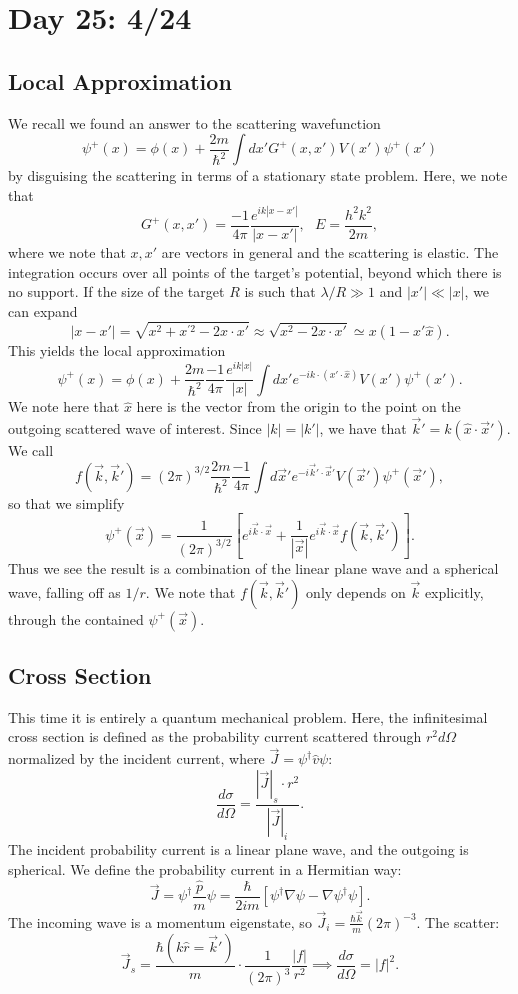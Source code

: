 \documentclass[fontsize=12pt]{scrartcl}
\newcommand{\mom}{\hat{p}}
\begin{document}
\section{Day 25: 4/24}

\subsection{Local Approximation}

We recall we found an answer to the scattering wavefunction $$\psi^+(x)=\phi(x)+\frac{2m}{\hbar^2}\int dx' G^+(x,x')V(x')\psi^+(x')$$ by disguising the scattering in terms of a stationary state problem. Here, we note that $$G^+(x,x')=\frac{-1}{4\pi} \frac{e^{ik|x-x'|}}{|x-x'|}, \ \ \ E=\frac{h^2k^2}{2m},$$ where we note that $x,x'$ are vectors in general and the scattering is elastic. The integration occurs over all points of the target's potential, beyond which there is no support. If the size of the target $R$ is such that $\lambda/R\gg 1$ and $|x'|\ll |x|$, we can expand $$|x-x'| = \sqrt{x^2+x^{'2}-2x\cdot x'}\approx \sqrt{x^2-2x\cdot x'} \simeq x(1-x'\hat{x}).$$ This yields the local approximation $$\psi^+(x)=\phi(x)+\frac{2m}{\hbar^2}\frac{-1}{4\pi}\frac{e^{ik|x|}}{|x|}\int dx' e^{-ik\cdot (x'\cdot \hat{x})} V(x')\psi^+(x').$$ We note here that $\hat{x}$ here is the vector from the origin to the point on the outgoing scattered wave of interest. Since $|k|=|k'|$, we have that $\vec{k}' = k(\hat{x}\cdot\vec{x}')$. We call $$f(\vec{k},\vec{k}') = (2\pi)^{3/2}\frac{2m}{\hbar^2}\frac{-1}{4\pi}\int d\vec{x}' e^{-i\vec{k}'\cdot\vec{x}'} V(\vec{x}')\psi^+(\vec{x}'),$$ so that we simplify $$\psi^+(\vec{x})=\frac{1}{(2\pi)^{3/2}}\left[e^{i\vec{k}\cdot\vec{x}}+\frac{1}{|\vec{x}|} e^{i\vec{k}\cdot\vec{x}}f(\vec{k},\vec{k}')\right].$$ Thus we see the result is a combination of the linear plane wave and a spherical wave, falling off as $1/r$. We note that $f(\vec{k},\vec{k}')$ only depends on $\vec{k}$ explicitly, through the contained $\psi^+(\vec{x})$.

\subsection{Cross Section}

This time it is entirely a quantum mechanical problem. Here, the infinitesimal cross section is defined as the probability current scattered through $r^2d\Omega$ normalized by the incident current, where $\vec{J}=\psi^\dagger\hat{v}\psi$: $$\frac{d\sigma}{d\Omega}=\frac{|\vec{J}|_s\cdot r^2}{|\vec{J}|_i}.$$ The incident probability current is a linear plane wave, and the outgoing is spherical. We define the probability current in a Hermitian way: $$\vec{J}=\psi^\dagger\frac{\mom}{m}\psi = \frac{\hbar}{2im}\left[\psi^\dagger\nabla\psi - \nabla\psi^\dagger\psi\right].$$ The incoming wave is a momentum eigenstate, so $\vec{J}_i=\frac{\hbar\vec{k}}{m}(2\pi)^{-3}$. The scatter: $$\vec{J}_s = \frac{\hbar(k\hat{r}=\vec{k}')}{m}\cdot\frac{1}{(2\pi)^3} \frac{|f|}{r^2}\implies \frac{d\sigma}{d\Omega}=|f|^2.$$
\end{document}
